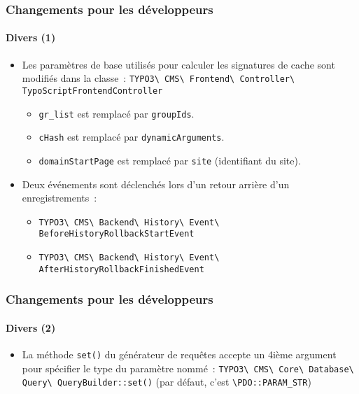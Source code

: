 \begin{frame}[fragile]
	\frametitle{Changements pour les développeurs}
	\framesubtitle{Divers (1)}

	\begin{itemize}
		\item Les paramètres de base utilisés pour calculer les signatures de cache sont
			modifiés dans la classe~:\newline
			\small
				\texttt{TYPO3\textbackslash
					CMS\textbackslash
					Frontend\textbackslash
					Controller\textbackslash
					TypoScriptFrontendController}
			\normalsize

			\begin{itemize}
				\item \texttt{gr\_list} est remplacé par \texttt{groupIds}.
				\item \texttt{cHash} est remplacé par \texttt{dynamicArguments}.
				\item \texttt{domainStartPage} est remplacé par \texttt{site} (identifiant du site).
			\end{itemize}

		\item Deux événements sont déclenchés lors d'un retour arrière d'un enregistrements~:

			\begin{itemize}\smaller
				\item \texttt{TYPO3\textbackslash
					CMS\textbackslash
					Backend\textbackslash
					History\textbackslash
					Event\textbackslash
					BeforeHistoryRollbackStartEvent}
				\item \texttt{TYPO3\textbackslash
					CMS\textbackslash
					Backend\textbackslash
					History\textbackslash
					Event\textbackslash
					AfterHistoryRollbackFinishedEvent}
			\end{itemize}\normalsize

	\end{itemize}

\end{frame}


\begin{frame}[fragile]
	\frametitle{Changements pour les développeurs}
	\framesubtitle{Divers (2)}

	\begin{itemize}
		\item La méthode \texttt{set()} du générateur de requêtes accepte un 4ième argument
			pour spécifier le type du paramètre nommé~:\newline
			\small
				\texttt{TYPO3\textbackslash
					CMS\textbackslash
					Core\textbackslash
					Database\textbackslash
					Query\textbackslash
					QueryBuilder::set()}
			\normalsize\newline
			\vspace{0.2cm}
			(par défaut, c'est \texttt{\textbackslash PDO::PARAM\_STR})

	\end{itemize}

\end{frame}

